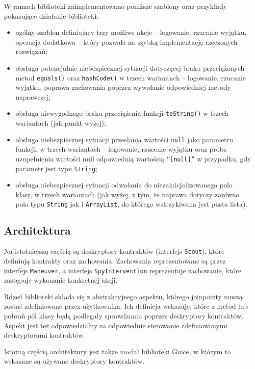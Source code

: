 \documentclass[12pt,a4paper,titlepage]{article}
\begin{document}
    W ramach biblioteki zaimplementowano poniższe szablony oraz przykłady pokazujące działanie biblioteki:
    \begin{itemize}
     \item ogólny szablon definiujący trzy możliwe akcje -- logowanie, rzucanie wyjątku, operacja dodatkowa -- który pozwala na szybką implementację rzeczonych rozwiązań;
     \item obsługa potencjalnie niebezpiecznej sytuacji dotyczącej braku przeciążonych metod \texttt{equals()} oraz \texttt{hashCode()} w trzech wariantach -- logowanie, rzucanie wyjątku, poprawa zachowania poprzez wywołanie odpowiedniej metody naprawczej;
     \item obsługa niewygodnego braku przeciążenia funkcji \texttt{toString()} w trzech wariantach (jak punkt wyżej);
     \item obsługa niebezpiecznej sytuacji przesłania wartości \texttt{null} jako parametru funkcji, w trzech wariantach -- logowanie, rzucenie wyjątku oraz próba uzupełnienia wartości null odpowiednią wartością \texttt{''[null]''} w przypadku, gdy parametr jest typu \texttt{String};
     \item obsługa niebezpiecznej sytuacji odwołania do niezainicjalizowanego pola klasy, w trzech wariantach (jak wyżej, z tym, że naprawa dotyczy zarówno pola typu \texttt{String} jak i \texttt{ArrayList}, do którego wstrzykiwana jest pusta lista).
    \end{itemize}
    
  \subsection{Architektura}
   Najistotniejszą częścią są deskryptory kontraktów (interfejs \texttt{Scout}), które definiują kontrakty oraz zachowania. Zachowania reprezentowane są przez interfejs \texttt{Maneuver}, a interfejs \texttt{SpyIntervention} reprezentuje zachowanie, które zastępuje wykonanie konkretnej akcji.
   
   Rdzeń biblioteki składa się z abstrakcyjnego aspektu, którego joinpointy muszą zostać zdefiniowane przez użytkownika. Ich definicja wskazuje, które z metod lub pobrań pól klasy będą podlegały sprawdzaniu poprzez deskryptory kontraktów. Aspekt jest też odpowiedzialny za odpowiednie sterowanie zdefiniowanymi deskryptorami kontraktów.
   
   Istotną częścią architektury jest także moduł biblioteki Guice, w którym to wskazane są używane deskryptory kontraktów.
\end{document}
